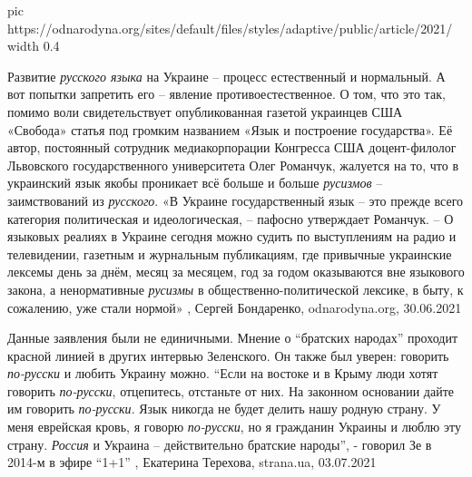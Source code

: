 
\ifcmt
  pic https://odnarodyna.org/sites/default/files/styles/adaptive/public/article/2021/%
	width 0.4
\fi

Развитие \emph{русского языка} на Украине – процесс естественный и нормальный. А вот
попытки запретить его – явление противоестественное. О том, что это так, помимо
воли свидетельствует опубликованная газетой украинцев США «Свобода» статья под
громким названием «Язык и построение государства». Её автор, постоянный
сотрудник медиакорпорации Конгресса США доцент-филолог Львовского
государственного университета Олег Романчук, жалуется на то, что в украинский
язык якобы проникает всё больше и больше \emph{русизмов} – заимствований из \emph{русского}.
«В Украине государственный язык – это прежде всего категория политическая и
идеологическая, – пафосно утверждает Романчук. – О языковых реалиях в Украине
сегодня можно судить по выступлениям на радио и телевидении, газетным и
журнальным публикациям, где привычные украинские лексемы день за днём, месяц за
месяцем, год за годом оказываются вне языкового закона, а ненормативные \emph{русизмы}
в общественно-политической лексике, в быту, к сожалению, уже стали нормой»
, Сергей Бондаренко, odnarodyna.org, 30.06.2021

Данные заявления были не единичными. Мнение о \enquote{братских народах}
проходит красной линией в других интервью Зеленского. Он также был уверен:
говорить \emph{по-русски} и любить Украину можно.  \enquote{Если на востоке и в Крыму
люди хотят говорить \emph{по-русски}, отцепитесь, отстаньте от них. На законном
основании дайте им говорить \emph{по-русски}. Язык никогда не будет делить нашу родную
страну. У меня еврейская кровь, я говорю \emph{по-русски}, но я гражданин Украины и
люблю эту страну. \emph{Россия} и Украина – действительно братские народы}, - говорил
Зе в 2014-м в эфире \enquote{1+1}
, 
Екатерина Терехова, strana.ua, 03.07.2021

